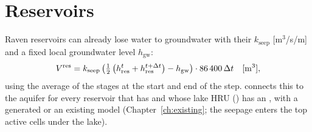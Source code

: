 \section{Reservoirs}\label{ch:reservoirs}
Raven reservoirs can already lose water to groundwater with their  $k_{\mathrm{seep}}$ [m$^3$/s/m] and a fixed
local groundwater level $h_{\mathrm{gw}}$:
\begin{equation}
V^{\mathrm{res}}=k_{\mathrm{seep}}\left(\tfrac12\left(h^{t}_{\mathrm{res}}+h^{t+\Delta t}_{\mathrm{res}}\right)-h_{\mathrm{gw}}\right)\cdot86\,400\,\Delta t
\quad[\mathrm{m}^3],
\end{equation}
using the average of the stages at the start and end of the step.  connects this to the aquifer
for every reservoir that has  and whose lake HRU () has an , with a
generated or an existing model (Chapter~\ref{ch:existing}; the seepage enters the top active cells under the lake).

